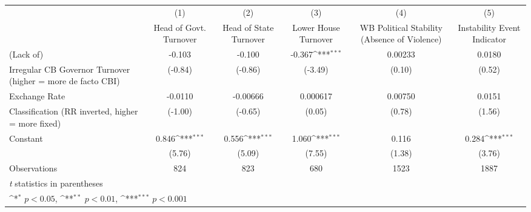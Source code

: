 {
\def\sym#1{\ifmmode^{#1}\else\(^{#1}\)\fi}
\begin{tabular}{l*{5}{c}}
\toprule
                &\multicolumn{1}{c}{(1)}&\multicolumn{1}{c}{(2)}&\multicolumn{1}{c}{(3)}&\multicolumn{1}{c}{(4)}&\multicolumn{1}{c}{(5)}\\
                &\multicolumn{1}{c}{Head of Govt. Turnover}&\multicolumn{1}{c}{Head of State Turnover}&\multicolumn{1}{c}{Lower House Turnover}&\multicolumn{1}{c}{WB Political Stability (Absence of Violence)}&\multicolumn{1}{c}{Instability Event Indicator}\\
\midrule
(Lack of)       &   -0.103         &   -0.100         &   -0.367\sym{***}&  0.00233         &   0.0180         \\
Irregular CB Governor Turnover (higher = more de facto CBI)&  (-0.84)         &  (-0.86)         &  (-3.49)         &   (0.10)         &   (0.52)         \\
\addlinespace
Exchange Rate   &  -0.0110         & -0.00666         & 0.000617         &  0.00750         &   0.0151         \\
Classification (RR inverted, higher = more fixed)&  (-1.00)         &  (-0.65)         &   (0.05)         &   (0.78)         &   (1.56)         \\
\addlinespace
Constant        &    0.846\sym{***}&    0.556\sym{***}&    1.060\sym{***}&    0.116         &    0.284\sym{***}\\
                &   (5.76)         &   (5.09)         &   (7.55)         &   (1.38)         &   (3.76)         \\
\midrule
Observations    &      824         &      823         &      680         &     1523         &     1887         \\
\bottomrule
\multicolumn{6}{l}{\footnotesize \textit{t} statistics in parentheses}\\
\multicolumn{6}{l}{\footnotesize \sym{*} \(p<0.05\), \sym{**} \(p<0.01\), \sym{***} \(p<0.001\)}\\
\end{tabular}
}
